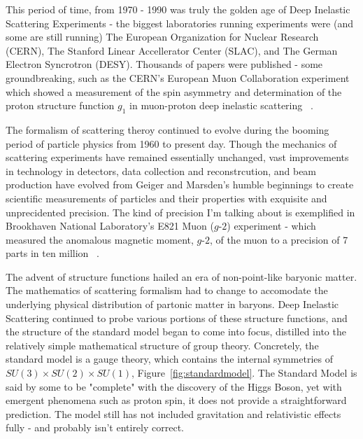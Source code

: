 This period of time, from 1970 - 1990 was truly the golden age of Deep Inelastic
Scattering Experiments - the biggest laboratories running experiments were (and
some are still running) The European Organization for Nuclear Research (CERN),
The Stanford Linear Accellerator Center (SLAC), and The German Electron
Syncrotron (DESY). Thousands of papers were published - some groundbreaking,
such as the CERN's European Muon Collaboration experiment which showed a
measurement of the spin asymmetry and determination of the proton structure
function $g_1$ in muon-proton deep inelastic scattering ~\cite{Ashman1988}. 

The formalism of scattering theroy continued to evolve during the booming period
of particle physics from 1960 to present day. Though the mechanics of scattering
experiments have remained essentially unchanged, vast improvements in technology
in detectors, data collection and reconstrcution, and beam production have
evolved from Geiger and Marsden's humble beginnings to create scientific
measurements of particles and their properties with exquisite and unprecidented
precision. The kind of precision I'm talking about is exemplified in Brookhaven
National Laboratory's E821 Muon ($g$-$2$) experiment - which measured the
anomalous magnetic moment, $g$-$2$, of the muon to a precision of 7 parts in ten
million ~\cite{Bennett}.

The advent of structure functions hailed an era of non-point-like baryonic
matter. The mathematics of scattering formalism had to change to accomodate the
underlying physical distribution of partonic matter in baryons. Deep Inelastic
Scattering continued to probe various portions of these structure functions, and
the structure of the standard model began to come into focus, distilled into
the relatively simple mathematical structure of group theory. Concretely, the
standard model is a gauge theory, which contains the internal symmetries of
$SU(3) \times SU(2) \times SU(1)$, Figure~\ref{fig:standardmodel}. The Standard
Model is said by some to be "complete" with the discovery of the Higgs Boson,
yet with emergent phenomena such as proton spin, it does not provide a
straightforward prediction. The model still has not included gravitation and
relativistic effects fully - and probably isn't entirely correct.

